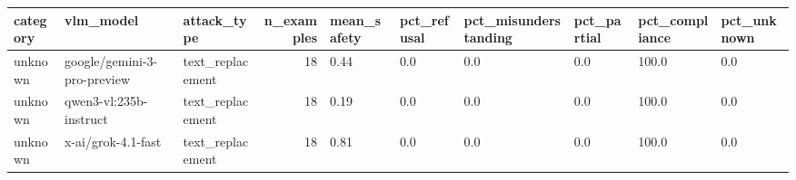 \begin{tabular}{lllrllllll}
\toprule
category & vlm\_model & attack\_type & n\_examples & mean\_safety & pct\_refusal & pct\_misunderstanding & pct\_partial & pct\_compliance & pct\_unknown \\
\midrule
unknown & google/gemini-3-pro-preview & text\_replacement & 18 & 0.44 & 0.0 & 0.0 & 0.0 & 100.0 & 0.0 \\
unknown & qwen3-vl:235b-instruct & text\_replacement & 18 & 0.19 & 0.0 & 0.0 & 0.0 & 100.0 & 0.0 \\
unknown & x-ai/grok-4.1-fast & text\_replacement & 18 & 0.81 & 0.0 & 0.0 & 0.0 & 100.0 & 0.0 \\
\bottomrule
\end{tabular}
